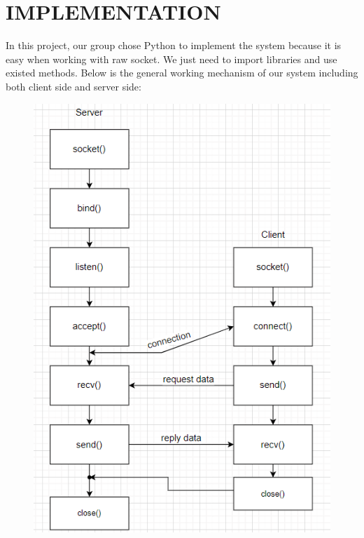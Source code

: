 \newpage
\vspace{6cm}
\section{IMPLEMENTATION}
\hspace{0.7cm}In this project, our group chose Python to implement the system because it is easy when working with raw socket. We just need to import libraries and use existed methods. Below is the general working mechanism of our system including both client side and server side:

\begin{figure}[h]
\centering
\includegraphics{images/socket.png}
\end{figure}


